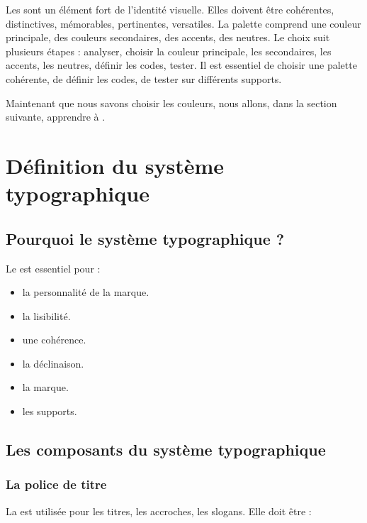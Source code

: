 Les  sont un élément fort de l'identité visuelle. Elles doivent être cohérentes, distinctives, mémorables, pertinentes, versatiles. La palette comprend une couleur principale, des couleurs secondaires, des accents, des neutres. Le choix suit plusieurs étapes : analyser, choisir la couleur principale, les secondaires, les accents, les neutres, définir les codes, tester. Il est essentiel de choisir une palette cohérente, de définir les codes, de tester sur différents supports.

Maintenant que nous savons choisir les couleurs, nous allons, dans la section suivante, apprendre à .

\section{Définition du système typographique}

\subsection{Pourquoi le système typographique ?}

Le  est essentiel pour :

\begin{itemize}
    \item {} la personnalité de la marque.
    \item {} la lisibilité.
    \item {} une cohérence.
    \item {} la déclinaison.
    \item {} la marque.
    \item {} les supports.
\end{itemize}

\subsection{Les composants du système typographique}

\subsubsection{La police de titre}

La  est utilisée pour les titres, les accroches, les slogans. Elle doit être :

